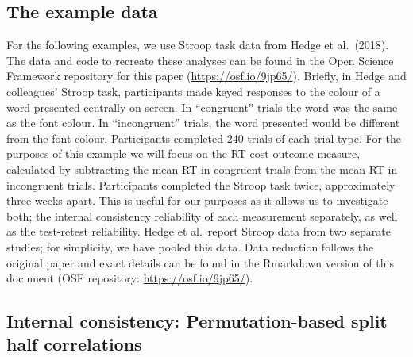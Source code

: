 \documentclass[english,,man,floatsintext]{apa6}
\begin{document}
\hypertarget{the-example-data}{%
\subsection{The example data}\label{the-example-data}}

For the following examples, we use Stroop task data from Hedge et al.~(2018). The data and code to recreate these analyses can be found in the Open Science Framework repository for this paper (\url{https://osf.io/9jp65/}). Briefly, in Hedge and colleagues' Stroop task, participants made keyed responses to the colour of a word presented centrally on-screen. In \enquote{congruent} trials the word was the same as the font colour. In \enquote{incongruent} trials, the word presented would be different from the font colour. Participants completed 240 trials of each trial type. For the purposes of this example we will focus on the RT cost outcome measure, calculated by subtracting the mean RT in congruent trials from the mean RT in incongruent trials. Participants completed the Stroop task twice, approximately three weeks apart. This is useful for our purposes as it allows us to investigate both; the internal consistency reliability of each measurement separately, as well as the test-retest reliability. Hedge et al.~report Stroop data from two separate studies; for simplicity, we have pooled this data. Data reduction follows the original paper and exact details can be found in the Rmarkdown version of this document (OSF repository: \url{https://osf.io/9jp65/}).

\hypertarget{internal-consistency-permutation-based-split-half-correlations}{%
\subsection{Internal consistency: Permutation-based split half correlations}\label{internal-consistency-permutation-based-split-half-correlations}}
\end{document}

